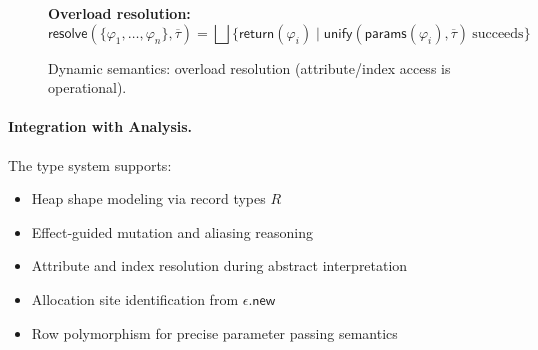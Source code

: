 \begin{figure*}[t]
\centering
\textbf{Overload resolution:}
\[
\mathsf{resolve}(\{\varphi_1, \ldots, \varphi_n\}, \overline{\tau}) =
\bigsqcup\{\mathsf{return}(\varphi_i) \mid \mathsf{unify}(\mathsf{params}(\varphi_i), \overline{\tau}) \ \text{succeeds}\}
\]
\caption{Dynamic semantics: overload resolution (attribute/index access is operational).}
\label{fig:dynamic}
\end{figure*}

\paragraph{Integration with Analysis.}  
The type system supports:
\begin{itemize}
\item Heap shape modeling via record types $R$
\item Effect‐guided mutation and aliasing reasoning
\item Attribute and index resolution during abstract interpretation
\item Allocation site identification from $\epsilon.\mathsf{new}$
\item Row polymorphism for precise parameter passing semantics
\end{itemize}
